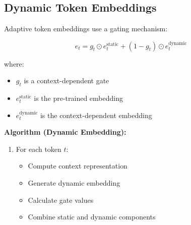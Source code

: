 \documentclass{article}
\begin{document}
\subsection{Dynamic Token Embeddings}
Adaptive token embeddings use a gating mechanism:

\begin{equation*}
e_t = g_t \odot e_t^{\text{static}} + (1-g_t) \odot e_t^{\text{dynamic}}
\end{equation*}

where:
\begin{itemize}
\item $g_t$ is a context-dependent gate
\item $e_t^{\text{static}}$ is the pre-trained embedding
\item $e_t^{\text{dynamic}}$ is the context-dependent embedding
\end{itemize}

\textbf{Algorithm (Dynamic Embedding):}
\begin{enumerate}
\item For each token $t$:
   \begin{itemize}
   \item Compute context representation
   \item Generate dynamic embedding
   \item Calculate gate values
   \item Combine static and dynamic components
   \end{itemize}
\end{enumerate}
\end{document}
